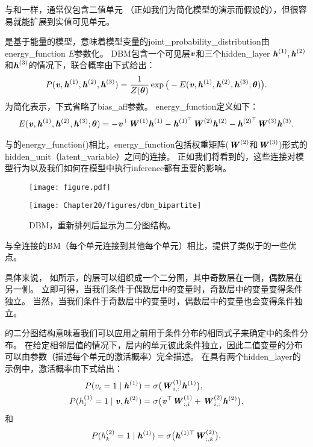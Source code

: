 与和一样，通常仅包含二值单元 （正如我们为简化模型的演示而假设的），但很容易就能扩展到实值可见单元。

是基于能量的模型，意味着模型变量的\gls{joint_probability_distribution}由\gls{energy_function} $E$参数化。
\gls{DBM}包含一个可见层$\boldsymbol{\mathit{v}}$和三个\gls{hidden_layer} $\boldsymbol{\mathit{h}}^{(1)},\boldsymbol{\mathit{h}}^{(2)}$和$\boldsymbol{\mathit{h}}^{(3)}$的情况下，联合概率由下式给出：
\begin{align}
 P(\boldsymbol{\mathit{v}}, \boldsymbol{\mathit{h}}^{(1)},  \boldsymbol{\mathit{h}}^{(2)},  \boldsymbol{\mathit{h}}^{(3)}) = \frac{1}{Z(\boldsymbol{\theta})} 
 \exp \big( -E(\boldsymbol{\mathit{v}}, \boldsymbol{\mathit{h}}^{(1)},  \boldsymbol{\mathit{h}}^{(2)},  \boldsymbol{\mathit{h}}^{(3)}; \boldsymbol{\theta}) \big).
\end{align}
为简化表示，下式省略了\gls{bias_aff}参数。
\gls{energy_function}定义如下：
\begin{align}
    E(\boldsymbol{\mathit{v}}, \boldsymbol{\mathit{h}}^{(1)}, \boldsymbol{\mathit{h}}^{(2)}, \boldsymbol{\mathit{h}}^{(3)}; \boldsymbol{\theta})  = -\boldsymbol{\mathit{v}}^\top \boldsymbol{\mathit{W}}^{(1)}\boldsymbol{\mathit{h}}^{(1)} 
 - \boldsymbol{\mathit{h}}^{(1)^\top}\boldsymbol{\mathit{W}}^{(2)}\boldsymbol{\mathit{h}}^{(2)}- \boldsymbol{\mathit{h}}^{(2)^\top}\boldsymbol{\mathit{W}}^{(3)}\boldsymbol{\mathit{h}}^{(3)}.
\end{align}

与的\gls{energy_function}()相比，\gls{energy_function}包括权重矩阵($\boldsymbol{\mathit{W}}^{(2)}$和$\boldsymbol{\mathit{W}}^{(3)}$)形式的\gls{hidden_unit}（\gls{latent_variable}）之间的连接。
正如我们将看到的，这些连接对模型行为以及我们如何在模型中执行\gls{inference}都有重要的影响。


\begin{figure}[!htb]
\ifOpenSource
\centerline{\texttt{[image: figure.pdf]}}
\else
\centerline{\texttt{[image: Chapter20/figures/dbm\_bipartite]}}
\fi
\caption{\gls{DBM}，重新排列后显示为二分图结构。}
\label{fig:chap20_dbm_bipartite}
\end{figure}

与全连接的\gls{BM}（每个单元连接到其他每个单元）相比，提供了类似于的一些优点。

具体来说， 如所示，的层可以组织成一个二分图，其中奇数层在一侧，偶数层在另一侧。
立即可得，当我们条件于偶数层中的变量时，奇数层中的变量变得条件独立。
当然，当我们条件于奇数层中的变量时，偶数层中的变量也会变得条件独立。

的二分图结构意味着我们可以应用之前用于条件分布的相同式子来确定中的条件分布。
在给定相邻层值的情况下，层内的单元彼此条件独立，因此二值变量的分布可以由参数（描述每个单元的激活概率）完全描述。
在具有两个\gls{hidden_layer}的示例中，激活概率由下式给出：
\begin{align}
 P(v_i=1  \mid  \boldsymbol{\mathit{h}}^{(1)}) &= \sigma \big( \boldsymbol{\mathit{W}}_{i,:}^{(1)}\boldsymbol{\mathit{h}}^{(1)} \big), \\
 P(h_i^{(1)}=1  \mid  \boldsymbol{\mathit{v}}, \boldsymbol{\mathit{h}}^{(2)}) &= \sigma \big( \boldsymbol{\mathit{v}}^\top  \boldsymbol{\mathit{W}}_{:,i}^{(1)}
 + \boldsymbol{\mathit{W}}_{i,:}^{(2)}\boldsymbol{\mathit{h}}^{(2)} \big) ,
\end{align}
和
\begin{align}
P(h_k^{(2)} =1  \mid  \boldsymbol{\mathit{h}}^{(1)}) = \sigma \big(\boldsymbol{\mathit{h}}^{(1)\top} \boldsymbol{\mathit{W}}_{:,k}^{(2)} \big).
\end{align}

